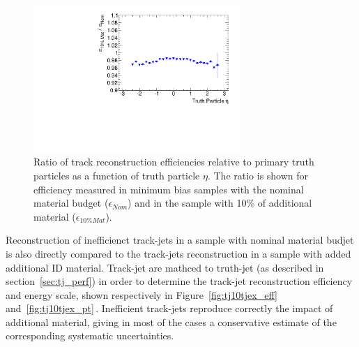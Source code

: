 \begin{figure}[p]
\centering
\includegraphics[width=0.7\textwidth]{figure/trackjet/trk_eff2.pdf}
\caption{Ratio of track reconstruction efficiencies relative to primary truth particles as a function of truth particle $\eta$.
	 The ratio is shown for efficiency measured in minimum bias samples with the nominal material budget ($\epsilon_{Nom}$)
	and in the sample with 10\% of additional material ($\epsilon_{10\%Mat}$).}

\label{fig:trk_eff}
\end{figure}    


Reconstruction of inefficienct track-jets in a sample with nominal material budjet is also directly compared 
to the track-jets reconstruction in a sample with added additional ID material. Track-jet are mathced
to truth-jet (as described in section~\ref{sec:tj_perf}) in order to determine the track-jet 
reconstruction efficiency and energy scale, shown respectively in Figure~\ref{fig:tj10tjex_eff} and~\ref{fig:tj10tjex_pt}$\,$.
Inefficient track-jets reproduce correctly the impact  of additional material,
giving in most of the cases a conservative estimate of the corresponding systematic uncertainties.


